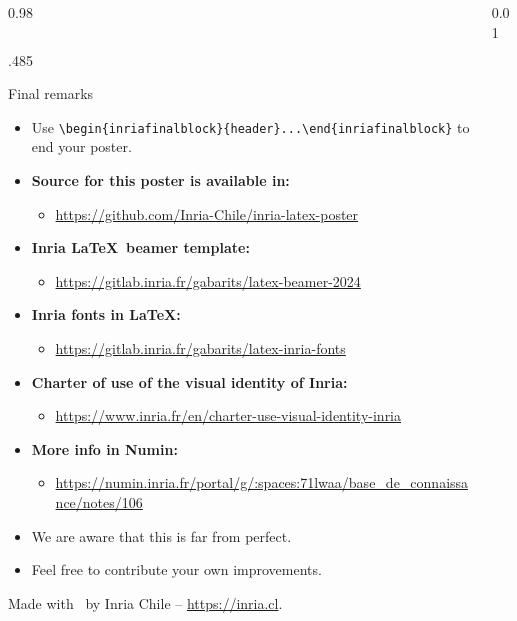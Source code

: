 \documentclass[final,svgnames,english]{beamer}
\begin{document}
\begin{frame}[fragile]{}
\begin{columns}[T]
\begin{column}{0.98\linewidth}
\begin{columns}[T]
\begin{column}{.485\linewidth}
    \begin{inriafinalblock}{Final remarks}
        \begin{itemize}
            \item Use \verb|\begin{inriafinalblock}{header}...\end{inriafinalblock}| to end your poster.
            \item \textbf{Source for this poster is available in:}
            \begin{itemize}
                \item \url{https://github.com/Inria-Chile/inria-latex-poster}
            \end{itemize} 
            \item \textbf{Inria \LaTeX\ beamer template:}
            \begin{itemize}
                \item \url{https://gitlab.inria.fr/gabarits/latex-beamer-2024}
            \end{itemize}
            \item \textbf{Inria fonts in \LaTeX:}
             \begin{itemize}
                \item \url{https://gitlab.inria.fr/gabarits/latex-inria-fonts}
                \end{itemize}
            \item \textbf{Charter of use of the visual identity of Inria:}
                \begin{itemize}
                    \item \url{https://www.inria.fr/en/charter-use-visual-identity-inria}
                \end{itemize}
            \item \textbf{More info in Numin:}
                \begin{itemize}
                    \item \url{https://numin.inria.fr/portal/g/:spaces:71lwaa/base_de_connaissance/notes/106} 
                \end{itemize}
            \item We are aware that this is far from perfect. 
            \item Feel free to contribute your own improvements.
        \end{itemize}
    \end{inriafinalblock}
    \begin{plainblock}{}
        \centering
        Made with \faHeart\ by Inria Chile -- \url{https://inria.cl}.
    \end{plainblock}
\end{column}
\end{columns}
\end{column}

\begin{column}{0.01\linewidth}
\end{column}
\end{columns}
\end{frame}
\end{document}
